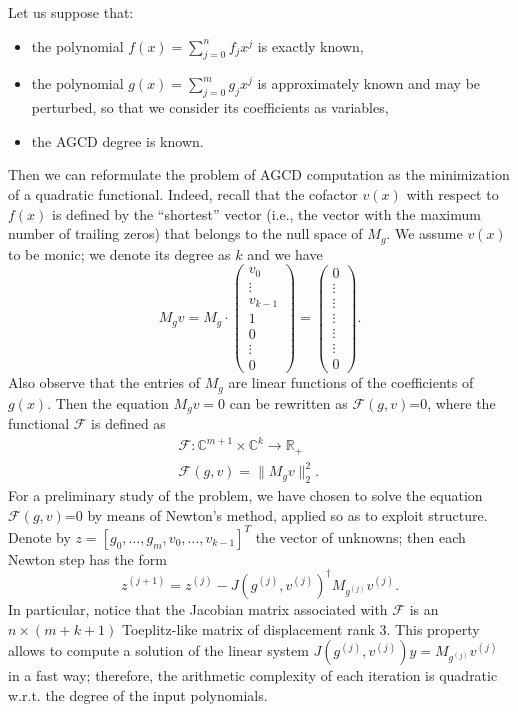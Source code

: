 \documentclass{article}
\newenvironment{itemizedot}{\begin{itemize} \renewcommand{\labelitemi}{$\bullet$}\renewcommand{\labelitemii}{$\bullet$}\renewcommand{\labelitemiii}{$\bullet$}\renewcommand{\labelitemiv}{$\bullet$}}{\end{itemize}}
\begin{document}
Let us suppose that:
\begin{itemizedot}
  \item the polynomial $f (x) = \sum_{j = 0}^n f_j x^j$ is exactly known,
  
  \item the polynomial $g (x) = \sum_{j = 0}^m g_j x^j$ is approximately known
  and may be perturbed, so that we consider its coefficients as variables,
  
  \item the AGCD degree is known. 
\end{itemizedot}
Then we can reformulate the problem of AGCD computation as the minimization
of a quadratic functional. Indeed, recall that the cofactor $v (x)$ with
respect to $f (x)$ is defined by the ``shortest'' vector (i.e., the vector
with the maximum number of trailing zeros) that belongs to the null space of
$M_g .$ We assume $v (x)$ to be monic; we denote its degree as $k$ and we have
\[ M_g v = M_g \cdot \left(\begin{array}{c}
     v_0\\
     \vdots\\
     v_{k - 1}\\
     1\\
     0\\
     \vdots\\
     0
   \end{array}\right) = \left(\begin{array}{c}
     0\\
     \vdots\\
     \vdots\\
     \vdots\\
     \vdots\\
     \vdots\\
     0
   \end{array}\right) . \]
Also observe that the entries of $M_g$ are linear functions of the
coefficients of $g (x)$. Then the equation $M_g v = 0$ can be rewritten as
$\mathcal{F}(g, v)$=0, where the functional $\mathcal{F}$ is defined as
\begin{eqnarray*}
  \mathcal{F}: \mathbb{C}^{m + 1} \times \mathbb{C}^k \longrightarrow
  \mathbb{R}_+ &  & \\
  \mathcal{F}(g, v) = \| M_g v \|_2^2 . &  & 
\end{eqnarray*}
For a preliminary study of the problem, we have chosen to solve the equation
$\mathcal{F}(g, v)$=0 by means of Newton's method, applied so as to exploit
structure. Denote by $z = [g_0, \ldots, g_m, v_0, \ldots, v_{k - 1}]^T$ the
vector of unknowns; then each Newton step has the form
\[ z_{}^{(j + 1)} = z^{(j)} - J (g^{(j)}, v^{(j)})^{\dagger} M_{g^{(j)}}
   v^{(j)} . \]
In particular, notice that the Jacobian matrix associated with $\mathcal{F}$
is an $n \times (m + k + 1)$ Toeplitz-like matrix of displacement rank $3$.
This property allows to compute a solution of the linear system $J (g^{(j)},
v^{(j)}) y = M_{g^{(j)}} v^{(j)}$ in a fast way; therefore, the arithmetic
complexity of each iteration is quadratic w.r.t. the degree of the input
polynomials.
\end{document}
